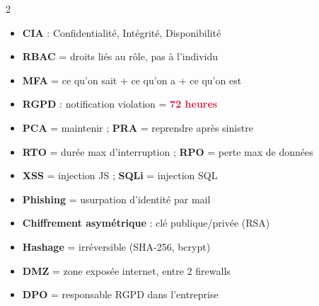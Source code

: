 \documentclass[a4paper,10pt]{article}
\newcommand{\warn}[1]{\textbf{\textcolor{crimson}{#1}}}
\begin{document}
\vspace{4pt}
\begin{tcolorbox}[basebox, colframe=crimson, title=Points clés à retenir pour l'examen]
\begin{multicols}{2}
\begin{itemize}
  \item \textbf{CIA} : Confidentialité, Intégrité, Disponibilité
  \item \textbf{RBAC} = droits liés au rôle, pas à l'individu
  \item \textbf{MFA} = ce qu'on sait + ce qu'on a + ce qu'on est
  \item \textbf{RGPD} : notification violation = \warn{72 heures}
  \item \textbf{PCA} = maintenir ; \textbf{PRA} = reprendre après sinistre
  \item \textbf{RTO} = durée max d'interruption ; \textbf{RPO} = perte max de données
  \item \textbf{XSS} = injection JS ; \textbf{SQLi} = injection SQL
  \item \textbf{Phishing} = usurpation d'identité par mail
  \item \textbf{Chiffrement asymétrique} : clé publique/privée (RSA)
  \item \textbf{Hashage} = irréversible (SHA-256, bcrypt)
  \item \textbf{DMZ} = zone exposée internet, entre 2 firewalls
  \item \textbf{DPO} = responsable RGPD dans l'entreprise
\end{itemize}
\end{multicols}
\end{tcolorbox}
\end{document}
